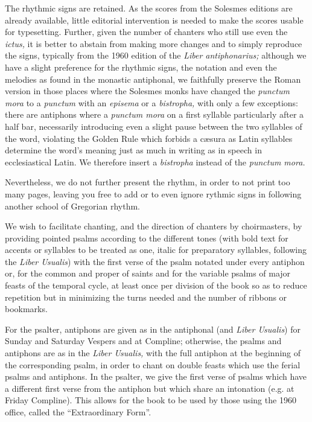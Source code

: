 \begin{enpars}

The rhythmic signs are retained. As the scores from the Solesmes editions are already available, little editorial intervention is needed to make the scores usable for typesetting. Further, given the number of chanters who still use even the \textit{ictus,}  it is better to abstain from making more changes and to simply reproduce the signs, typically from the 1960 edition of the \textit{Liber antiphonarius;} although we have a slight preference for the rhythmic signs, the notation and even the melodies as found in the monastic antiphonal, we faithfully preserve the Roman version in those places where the Solesmes monks have changed the \textit{punctum mora} to a  \textit{punctum} with an \textit{episema} or a \textit{bistropha,} with only a few exceptions: there are antiphons where a \textit{punctum mora} on a first syllable particularly after a half bar, necessarily introducing even a slight pause between the two syllables of the word, violating the Golden Rule which forbids a cæsura as Latin syllables determine the word's meaning just as much in writing as in speech in ecclesiastical Latin. We therefore insert a \textit{bistropha} instead of the \textit{punctum mora.}

Nevertheless, we do not further present the rhythm, in order to not print too many pages, leaving you free to add or to even ignore rythmic signs in following another school of Gregorian rhythm.

We wish to facilitate chanting, and the direction of chanters by choirmasters, by providing pointed psalms according to the different tones (with bold text for accents or syllables to be treated as one, italic for preparatory syllables, following the \textit{Liber Usualis}) with the first verse of the psalm notated under every antiphon or, for the common and proper of saints and for the variable psalms of major feasts of the temporal cycle, at least once per division of the book so as to reduce repetition but in minimizing the turns needed and the number of ribbons or bookmarks.

For the psalter, antiphons are given as in the antiphonal (and \textit{Liber Usualis}) for Sunday and Saturday Vespers and at Compline; otherwise, the psalms and antiphons are as in the \textit{Liber Usualis,} with the full antiphon at the beginning of the corresponding psalm, in order to chant on double feasts which use the ferial psalms and antiphons. In the psalter, we give the first verse of psalms which have a different first verse from the antiphon but which share an intonation (e.g. at Friday Compline). This allows for the book to be used by those using the 1960 office, called the ``Extraordinary Form''.


\end{enpars}
